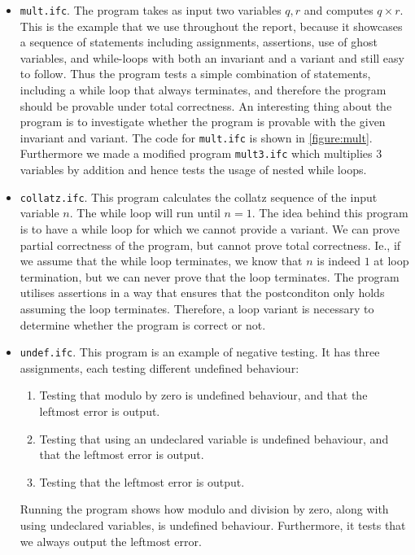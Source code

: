 \begin{itemize}
  \item {\texttt{mult.ifc}.} 
	The program takes as input two variables $q,r$ and computes $q \times r$.
  This is the example that we use throughout the report, because it showcases a sequence of statements including assignments, assertions, use of ghost variables, and while-loops with both an invariant and a variant and still easy to follow.
  Thus the program tests a simple combination of statements, including a while loop that always terminates, and therefore the program should be provable under total correctness.
  An interesting thing about the program is to investigate whether the program is provable with the given invariant and variant.
  The code for \texttt{mult.ifc} is shown in \cref{figure:mult}. Furthermore we made a modified program \texttt{mult3.ifc} which multiplies 3 variables by addition and hence tests the usage of nested while loops.

  \item{\texttt{collatz.ifc}.}
  This program calculates the collatz sequence of the input variable $n$. The while loop will run until $n = 1$.
  The idea behind this program is to have a while loop for which we cannot provide a variant. 
	We can prove partial correctness of the program, but cannot prove total correctness.
	Ie., if we assume that the while loop terminates, we know that $n$ is indeed $1$ at loop termination, but we can never prove that the loop terminates.
  The program utilises assertions in a way that ensures that the postconditon only holds assuming the loop terminates.
  Therefore, a loop variant is necessary to determine whether the program is correct or not.

  \item{\texttt{undef.ifc}.}
	This program is an example of negative testing.
  It has three assignments, each testing different undefined behaviour:
	\begin{enumerate}
		\item Testing that modulo by zero is undefined behaviour, and that the leftmost error is output.
		\item Testing that using an undeclared variable is undefined behaviour, and that the leftmost error is output.
		\item Testing that the leftmost error is output.
	\end{enumerate}
  Running the program shows how modulo and division by zero, along with using undeclared variables, is undefined behaviour.
	Furthermore, it tests that we always output the leftmost error.


\end{itemize}
